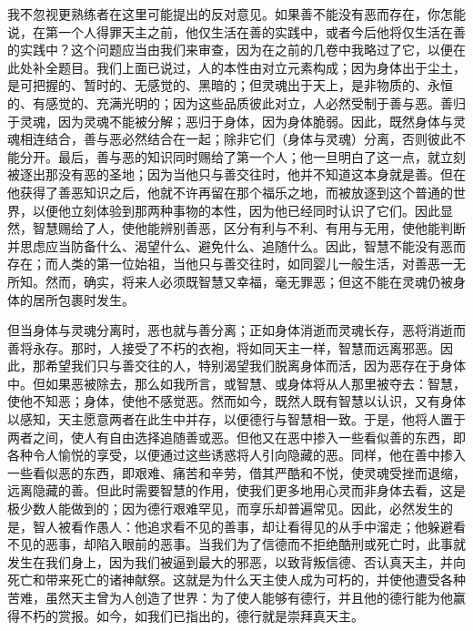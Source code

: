 我不忽视更熟练者在这里可能提出的反对意见。如果善不能没有恶而存在，你怎能说，在第一个人得罪天主之前，他仅生活在善的实践中，或者今后他将仅生活在善的实践中？这个问题应当由我们来审查，因为在之前的几卷中我略过了它，以便在此处补全题目。我们上面已说过，人的本性由对立元素构成；因为身体出于尘土，是可把握的、暂时的、无感觉的、黑暗的；但灵魂出于天上，是非物质的、永恒的、有感觉的、充满光明的；因为这些品质彼此对立，人必然受制于善与恶。善归于灵魂，因为灵魂不能被分解；恶归于身体，因为身体脆弱。因此，既然身体与灵魂相连结合，善与恶必然结合在一起；除非它们（身体与灵魂）分离，否则彼此不能分开。最后，善与恶的知识同时赐给了第一个人；他一旦明白了这一点，就立刻被逐出那没有恶的圣地；因为当他只与善交往时，他并不知道这本身就是善。但在他获得了善恶知识之后，他就不许再留在那个福乐之地，而被放逐到这个普通的世界，以便他立刻体验到那两种事物的本性，因为他已经同时认识了它们。因此显然，智慧赐给了人，使他能辨别善恶，区分有利与不利、有用与无用，使他能判断并思虑应当防备什么、渴望什么、避免什么、追随什么。因此，智慧不能没有恶而存在；而人类的第一位始祖，当他只与善交往时，如同婴儿一般生活，对善恶一无所知。然而，确实，将来人必须既智慧又幸福，毫无罪恶；但这不能在灵魂仍被身体的居所包裹时发生。\par

但当身体与灵魂分离时，恶也就与善分离；正如身体消逝而灵魂长存，恶将消逝而善将永存。那时，人接受了不朽的衣袍，将如同天主一样，智慧而远离邪恶。因此，那希望我们只与善交往的人，特别渴望我们脱离身体而活，因为恶存在于身体中。但如果恶被除去，那么如我所言，或智慧、或身体将从人那里被夺去：智慧，使他不知恶；身体，使他不感觉恶。然而如今，既然人既有智慧以认识，又有身体以感知，天主愿意两者在此生中并存，以便德行与智慧相一致。于是，他将人置于两者之间，使人有自由选择追随善或恶。但他又在恶中掺入一些看似善的东西，即各种令人愉悦的享受，以便通过这些诱惑将人引向隐藏的恶。同样，他在善中掺入一些看似恶的东西，即艰难、痛苦和辛劳，借其严酷和不悦，使灵魂受挫而退缩，远离隐藏的善。但此时需要智慧的作用，使我们更多地用心灵而非身体去看，这是极少数人能做到的；因为德行艰难罕见，而享乐却普遍常见。因此，必然发生的是，智人被看作愚人：他追求看不见的善事，却让看得见的从手中溜走；他躲避看不见的恶事，却陷入眼前的恶事。当我们为了信德而不拒绝酷刑或死亡时，此事就发生在我们身上，因为我们被逼到最大的邪恶，以致背叛信德、否认真天主，并向死亡和带来死亡的诸神献祭。这就是为什么天主使人成为可朽的，并使他遭受各种苦难，虽然天主曾为人创造了世界：为了使人能够有德行，并且他的德行能为他赢得不朽的赏报。如今，如我们已指出的，德行就是崇拜真天主。\par


